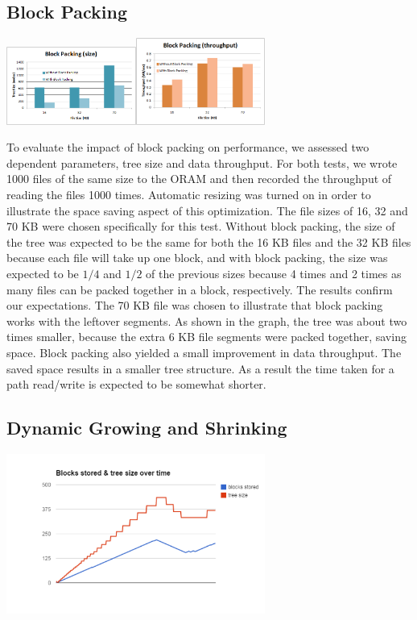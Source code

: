 \documentclass[conference]{IEEEtran}
\begin{document}
\subsection{Block Packing}
\begin{center}
\noindent\includegraphics[width=4.25cm]{550.png}\includegraphics[width=4.25cm]{551.png}
\end{center}

To evaluate the impact of block packing on performance, we assessed two dependent parameters, tree size and data throughput. For both tests, we wrote 1000 files of the same size to the ORAM and then recorded the throughput of reading the files 1000 times. Automatic resizing was turned on in order to illustrate the space saving aspect of this optimization. The file sizes of 16, 32 and 70 KB were chosen specifically for this test. Without block packing, the size of the tree was expected to be the same for both the 16 KB files and the 32 KB files because each file will take up one block, and with block packing, the size was expected to be $1/4$ and $1/2$ of the previous sizes because 4 times and 2 times as many files can be packed together in a block, respectively. The results confirm our expectations. The 70 KB file was chosen to illustrate that block packing works with the leftover segments. As shown in the graph, the tree was about two times smaller, because the extra 6 KB file segments were packed together, saving space. Block packing also yielded a small improvement in data throughput. The saved space results in a smaller tree structure. As a result the time taken for a path read/write is expected to be somewhat shorter.

\subsection{Dynamic Growing and Shrinking}
\begin{center}
\noindent\includegraphics[width=8.5cm]{560.png}
\end{center}
\end{document}
